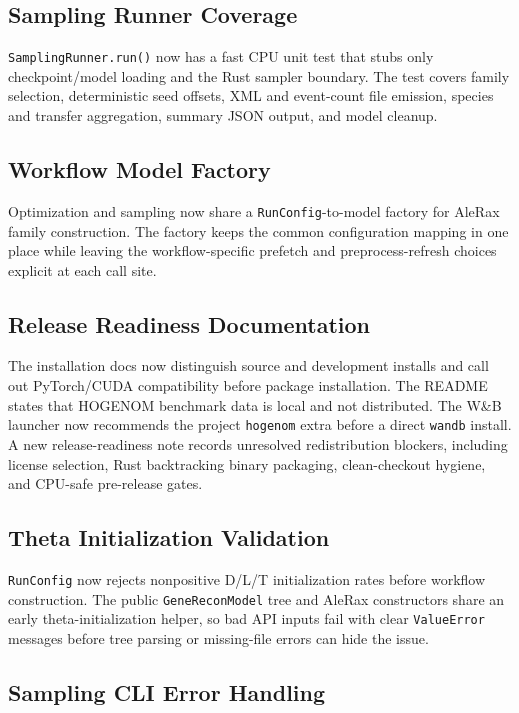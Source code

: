 \documentclass[11pt]{article}
\begin{document}
\subsection{Sampling Runner Coverage}

\texttt{SamplingRunner.run()} now has a fast CPU unit test that stubs only
checkpoint/model loading and the Rust sampler boundary.  The test covers family
selection, deterministic seed offsets, XML and event-count file emission,
species and transfer aggregation, summary JSON output, and model cleanup.

\subsection{Workflow Model Factory}

Optimization and sampling now share a \texttt{RunConfig}-to-model factory for
AleRax family construction.  The factory keeps the common configuration mapping
in one place while leaving the workflow-specific prefetch and preprocess-refresh
choices explicit at each call site.

\subsection{Release Readiness Documentation}

The installation docs now distinguish source and development installs and call
out PyTorch/CUDA compatibility before package installation.  The README states
that HOGENOM benchmark data is local and not distributed.  The W\&B launcher
now recommends the project \texttt{hogenom} extra before a direct
\texttt{wandb} install.  A new release-readiness note records unresolved
redistribution blockers, including license selection, Rust backtracking binary
packaging, clean-checkout hygiene, and CPU-safe pre-release gates.

\subsection{Theta Initialization Validation}

\texttt{RunConfig} now rejects nonpositive D/L/T initialization rates before
workflow construction.  The public \texttt{GeneReconModel} tree and AleRax
constructors share an early theta-initialization helper, so bad API inputs fail
with clear \texttt{ValueError} messages before tree parsing or missing-file
errors can hide the issue.

\subsection{Sampling CLI Error Handling}
\end{document}

